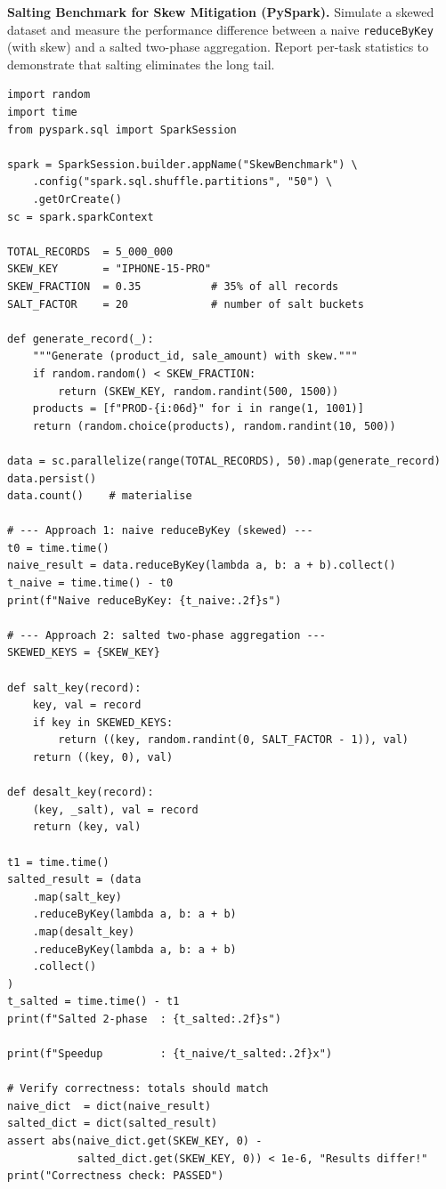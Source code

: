\pe \textbf{Salting Benchmark for Skew Mitigation (PySpark).}
Simulate a skewed dataset and measure the performance difference between
a naive \texttt{reduceByKey} (with skew) and a salted two-phase
aggregation. Report per-task statistics to demonstrate that salting
eliminates the long tail.

\begin{lstlisting}[style=pyspark, caption={PE6.3: Salting benchmark for skew mitigation}]
import random
import time
from pyspark.sql import SparkSession

spark = SparkSession.builder.appName("SkewBenchmark") \
    .config("spark.sql.shuffle.partitions", "50") \
    .getOrCreate()
sc = spark.sparkContext

TOTAL_RECORDS  = 5_000_000
SKEW_KEY       = "IPHONE-15-PRO"
SKEW_FRACTION  = 0.35           # 35% of all records
SALT_FACTOR    = 20             # number of salt buckets

def generate_record(_):
    """Generate (product_id, sale_amount) with skew."""
    if random.random() < SKEW_FRACTION:
        return (SKEW_KEY, random.randint(500, 1500))
    products = [f"PROD-{i:06d}" for i in range(1, 1001)]
    return (random.choice(products), random.randint(10, 500))

data = sc.parallelize(range(TOTAL_RECORDS), 50).map(generate_record)
data.persist()
data.count()    # materialise

# --- Approach 1: naive reduceByKey (skewed) ---
t0 = time.time()
naive_result = data.reduceByKey(lambda a, b: a + b).collect()
t_naive = time.time() - t0
print(f"Naive reduceByKey: {t_naive:.2f}s")

# --- Approach 2: salted two-phase aggregation ---
SKEWED_KEYS = {SKEW_KEY}

def salt_key(record):
    key, val = record
    if key in SKEWED_KEYS:
        return ((key, random.randint(0, SALT_FACTOR - 1)), val)
    return ((key, 0), val)

def desalt_key(record):
    (key, _salt), val = record
    return (key, val)

t1 = time.time()
salted_result = (data
    .map(salt_key)
    .reduceByKey(lambda a, b: a + b)
    .map(desalt_key)
    .reduceByKey(lambda a, b: a + b)
    .collect()
)
t_salted = time.time() - t1
print(f"Salted 2-phase  : {t_salted:.2f}s")

print(f"Speedup         : {t_naive/t_salted:.2f}x")

# Verify correctness: totals should match
naive_dict  = dict(naive_result)
salted_dict = dict(salted_result)
assert abs(naive_dict.get(SKEW_KEY, 0) -
           salted_dict.get(SKEW_KEY, 0)) < 1e-6, "Results differ!"
print("Correctness check: PASSED")
\end{lstlisting}
